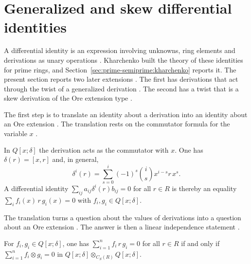 \section{Generalized and skew differential identities}\label{sec:generalized-twisted:differential-identities}

A differential identity is an expression involving unknowns, ring elements and
derivations as unary operations \cite[p.~155]{Kharchenko1978}. Kharchenko built
the theory of these identities for prime rings, and
Section~\ref{sec:prime-semiprime:kharchenko} reports it. The present section
reports two later extensions \cite[p.~2838]{Chuang2017Auto}. The first has
derivations that act through the twist of a generalized derivation
\cite[p.~885]{DeFilippisFosner2012}. The second has a twist that is a skew
derivation of the Ore extension type \cite[p.~2838]{Chuang2017Auto}.

The first step is to translate an identity about a derivation into an identity
about an Ore extension \cite[p.~172]{ChuangLee2010Higher}. The translation rests
on the commutator formula for the variable $x$
\cite[p.~172]{ChuangLee2010Higher}.

\begin{remark}\label{rem:gen:identity-translate}
In $Q[x;\delta]$ the derivation acts as the commutator with $x$. One has
$\delta(r)=[x,r]$ and, in general, %
\begin{equation*}
\delta^{i}(r)=\sum_{s=0}^{i}(-1)^{s}\binom{i}{s}x^{i-s}r\,x^{s}.
\end{equation*}
A differential identity $\sum_{ij}a_{ij}\delta^{i}(r)b_{ij}=0$ for all $r\in R$
is thereby an equality $\sum_{i}f_{i}(x)\,r\,g_{i}(x)=0$ with $f_{i},g_{i}\in
Q[x;\delta]$.
\end{remark}

The translation turns a question about the values of derivations into a
question about an Ore extension \cite[p.~172]{ChuangLee2010Higher}. The answer
is then a linear independence statement
\cite[Theorem~11, p.~172]{ChuangLee2010Higher}.

\begin{theorem}\label{thm:gen:identity-independence}
For $f_{i},g_{i}\in Q[x;\delta]$, one has $\sum_{i=1}^{n}f_{i}\,r\,g_{i}=0$ for
all $r\in R$ if and only if $\sum_{i=1}^{n}f_{i}\otimes g_{i}=0$ in
$Q[x;\delta]\otimes_{C_{S}(R)}Q[x;\delta]$.
\end{theorem}

